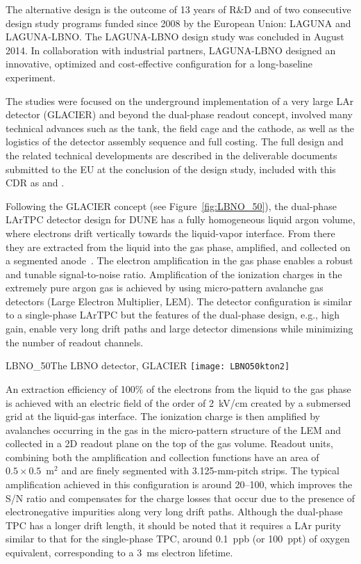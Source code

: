 The alternative design is the  outcome of 13 years of R\&D and of two consecutive design study programs funded since 2008 by the European Union: LAGUNA and LAGUNA-LBNO. The LAGUNA-LBNO design study was concluded in August 2014.   In collaboration with industrial partners, LAGUNA-LBNO designed an innovative, optimized and cost-effective configuration for a long-baseline experiment. 

The studies  were focused on the underground implementation of a very large LAr detector (GLACIER) and
beyond the dual-phase readout concept, involved many technical advances such as the tank, the field cage and the cathode, as well as the logistics of 
the detector assembly sequence and full costing. The full design and the related technical developments are described in the deliverable
documents submitted to the EU at the conclusion of the design study, included with this CDR as \anxlbnoa and \anxlbnob.

Following the GLACIER concept \cite{LAGUNA-LBNO-deliv} (see Figure~\ref{fig:LBNO_50}),  the dual-phase LArTPC detector design for DUNE has a fully homogeneous liquid argon volume, where electrons drift vertically towards the liquid-vapor interface. From there they are extracted from the liquid into the gas phase, amplified, and collected on a segmented anode~\cite{Badertscher:2013wm,Badertscher:2012dq,Badertscher:2010zg}. The electron amplification in the gas phase enables a robust and tunable signal-to-noise ratio. Amplification of the ionization charges in the extremely pure argon gas is achieved by using micro-pattern avalanche gas detectors (Large Electron Multiplier, LEM). The detector configuration is similar to a single-phase LArTPC but the features  of the dual-phase design, e.g., high gain, enable very long drift paths and large detector dimensions while minimizing the number of readout channels.

\begin{cdrfigure}{LBNO_50}{The  LBNO detector, GLACIER}
\texttt{[image: LBNO50kton2]}
\end{cdrfigure}

An extraction efficiency of 100\% of the electrons from the liquid to the gas phase is achieved with an electric field of the order of 2~kV/cm created by a submersed grid at the liquid-gas interface. The ionization charge is then amplified by avalanches occurring in the gas in the micro-pattern structure of the LEM and collected in a 2D readout plane on the top of the gas volume. Readout units, combining both the amplification and collection functions have an area
of $0.5\times 0.5$~m$^2$ and are finely segmented with 3.125-mm-pitch  strips. The typical amplification achieved in this configuration is around 20--100,  which  improves the S/N ratio and compensates for the charge losses that occur due to the presence of electronegative impurities along very long drift paths. Although the dual-phase TPC has a longer drift length, it should be noted that it requires a LAr purity similar to that for the single-phase TPC, around 0.1~ppb (or 100~ppt) of oxygen equivalent, corresponding to a 3~ms electron lifetime.

